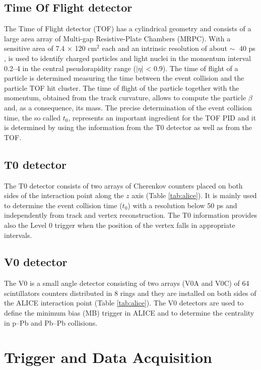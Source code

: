 %
\subsection{Time Of Flight detector} \label{sec:tof}

The Time of Flight detector (TOF) has a cylindrical geometry and consists of a large area array of 
Multi-gap Resistive-Plate Chambers (MRPC).
With a sensitive area of 7.4 × 120 cm$^2$ each and an intrinsic resolution of about $\sim\;$ 40 ps 
\cite{alicemulti}, is used to identify charged particles and light nuclei in the momentum interval 
0.2--4 \gevc in the central pseudorapidity range ($|\eta|$ < 0.9).
The time of flight of a particle is determined measuring the time between the event collision and the
particle TOF hit cluster. 
The time of flight of the particle together with the momentum, obtained from the track curvature, 
allows to compute the particle $\beta$ and, as a consequence, its mass.
The precise determination of the event collision time, the so called $t_{0}$, represents an important
ingredient for the TOF PID and it is determined by using the information from the T0 detector as 
well as from the TOF. 

%
\subsection{T0 detector} \label{sec:t0}

The T0 detector consists of two arrays of Cherenkov counters placed on both sides of the interaction point 
along the $z$ axis (Table \ref{tab:alice}).
It is mainly used to determine the event collision time ($t_{0}$) with a resolution below 50 ps and 
independently from track and vertex reconstruction. 
The T0 information provides also the Level 0 trigger when the position of the vertex falls in appropriate 
intervals.

%
\subsection{V0 detector} \label{sec:v0}

The V0 is a small angle detector consisting of two arrays (V0A and V0C) of 64 scintillators counters 
distributed in 8 rings and they are installed on both sides of the ALICE interaction point 
(Table \ref{tab:alice}). 
The V0 detectors are used to define the minimum bias (MB) trigger in ALICE and to determine the
centrality in p–Pb and Pb–Pb collisions.

%
%
\section{Trigger and Data Acquisition} \label{sec:data_flow}

